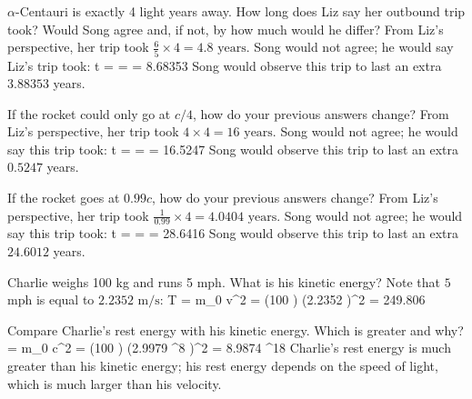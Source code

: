 \item $\alpha$-Centauri is exactly 4 light years away.  How long does Liz say her outbound trip took? Would Song agree and, if not, by how much would he differ?
\newline From Liz's perspective, her trip took $\frac{6}{5} \times 4 = 4.8 \text{ years}$.
\newline Song would not agree; he would say Liz's trip took:
\be
\Delta t =  =  = 8.68353 
\ee
Song would observe this trip to last an extra $3.88353$ years.

\item If the rocket could only go at $c/4$, how do your previous answers change?
\newline From Liz's perspective, her trip took $4 \times 4 = 16 \text{ years}$.
\newline Song would not agree; he would say this trip took:
\be
\Delta t =  =  = 16.5247 
\ee
Song would observe this trip to last an extra $0.5247$ years.

\item If the rocket goes at $0.99 c$, how do your previous answers change?
\newline From Liz's perspective, her trip took $\frac{1}{0.99} \times 4 = 4.0404 \text{ years}$.
\newline Song would not agree; he would say this trip took:
\be
\Delta t =  =  = 28.6416 
\ee
Song would observe this trip to last an extra $24.6012$ years.

\enu

\newpage
{}

\benu

\item
Charlie weighs 100 kg and runs 5 mph. What is his kinetic energy?
\newline Note that $5$ mph is equal to $2.2352 \text{ m/s}$:
\be
T =  m_0 v^2 =  \left(100 \right) \left(2.2352 \right)^2 = 249.806 
\ee

\item
Compare Charlie's  rest energy with his kinetic energy.  Which is greater and why?
\be
{} = m_0 c^2 = \left(100 \right) \left(2.9979 ^8 \right)^2 = 8.9874 ^{18} 
\ee
Charlie's rest energy is much greater than his kinetic energy; his rest energy depends on the speed of light, which is much larger than his velocity.

